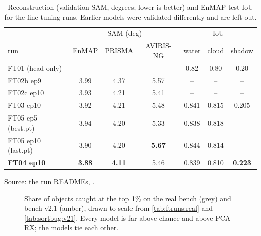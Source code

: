 \begin{table}[htbp]
\centering
\caption{Reconstruction (validation SAM, degrees; lower is better) and EnMAP test IoU for the fine-tuning runs.
Earlier models were validated differently and are left out.}
\label{tab:ftruns:recon}
\small
\begin{tabular}{lcccccc}
\toprule
 & \multicolumn{3}{c}{SAM (deg)} & \multicolumn{3}{c}{IoU} \\
run & EnMAP & PRISMA & AVIRIS-NG & water & cloud & shadow \\
\midrule
FT01 (head only) & -- & -- & -- & 0.82 & 0.80 & 0.20 \\
FT02b ep9 & 3.99 & 4.37 & 5.57 & -- & -- & -- \\
FT02c ep10 & 3.93 & 4.21 & 5.41 & -- & -- & -- \\
FT03 ep10 & 3.92 & 4.21 & 5.48 & 0.841 & 0.815 & 0.205 \\
FT05 ep5 (best.pt) & 3.94 & 4.20 & 5.33 & 0.838 & 0.818 & -- \\
FT05 ep10 (last.pt) & 3.90 & 4.20 & \textbf{5.67} & 0.844 & 0.814 & -- \\
\textbf{FT04 ep10} & \textbf{3.88} & \textbf{4.11} & 5.46 & 0.839 & 0.810 & \textbf{0.223} \\
\bottomrule
\end{tabular}

\smallskip
{\footnotesize Source: the run READMEs, .}
\end{table}

\begin{figure}[htbp]
\centering
{}
\caption{Share of objects caught at the top 1\% on the real bench (grey) and bench-v2.1 (amber), drawn to scale from
\cref{tab:ftruns:real} and \cref{tab:sortbug:v21}. Every model is far above chance and above PCA-RX; the models tie each
other.}
\label{fig:ftruns:board}
\end{figure}

